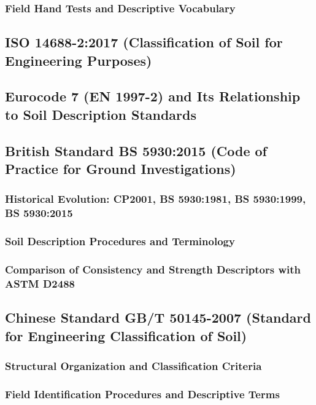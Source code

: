 \subsubsection{Field Hand Tests and Descriptive Vocabulary}

\subsection{ISO 14688-2:2017 (Classification of Soil for Engineering Purposes)}

\subsection{Eurocode 7 (EN 1997-2) and Its Relationship to Soil Description Standards}

\subsection{British Standard BS 5930:2015 (Code of Practice for Ground Investigations)}

\subsubsection{Historical Evolution: CP2001, BS 5930:1981, BS 5930:1999, BS 5930:2015}

\subsubsection{Soil Description Procedures and Terminology}

\subsubsection{Comparison of Consistency and Strength Descriptors with ASTM D2488}

\subsection{Chinese Standard GB/T 50145-2007 (Standard for Engineering Classification of Soil)}

\subsubsection{Structural Organization and Classification Criteria}

\subsubsection{Field Identification Procedures and Descriptive Terms}

